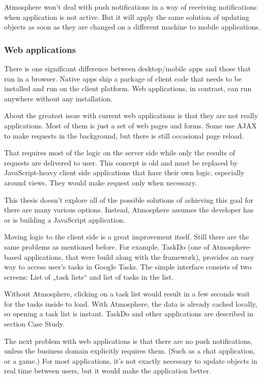 Atmosphere won’t deal with push notifications in a way of receiving notifications when application is not active. But it will apply the same solution of updating objects as soon as they are changed on a different machine to mobile applications. 

\subsubsection{Web applications}

There is one significant difference between desktop/mobile apps and those that run in a browser. Native apps ship a package of client code that needs to be installed and run on the client platform. Web applications, in contrast, can run anywhere without any installation.

About the greatest issue with current web applications is that they are not really applications. Most of them is just a set of web pages and forms. Some use AJAX to make requests in the background, but there is still occasional page reload.

That requires most of the logic on the server side while only the results of requests are delivered to user. This concept is old and must be replaced by JavaScript-heavy client side applications that have their own logic, especially around views. They would make request only when necessary.

This thesis doesn’t explore all of the possible solutions of achieving this goal for there are many various options. Instead, Atmosphere assumes the developer has or is building a JavaScript application.

Moving logic to the client side is a great improvement itself. Still there are the same problems as mentioned before. For example, TaskDo (one of Atmosphere-based applications, that were build along with the framework), provides an easy way to access user’s tasks in Google Tasks. The simple interface consists of two screens: List of „task lists“ and list of tasks in the list.

Without Atmosphere, clicking on a task list would result in a few seconds wait for the tasks inside to load. With Atmosphere, the data is already cached locally, so opening a task list is instant. TaskDo and other applications are described in section Case Study.

The next problem with web applications is that there are no push notifications, unless the business domain explicitly requires them. (Such as a chat application, or a game.) For most applications, it’s not exactly necessary to update objects  in real time between users, but it would make the application better.